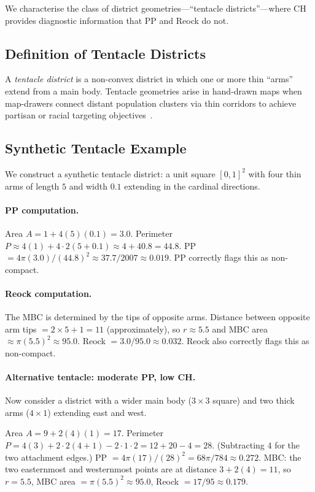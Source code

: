 We characterise the class of district geometries---``tentacle districts''---where
CH provides diagnostic information that PP and Reock do not.

\subsection{Definition of Tentacle Districts}

A \emph{tentacle district} is a non-convex district in which one or more
thin ``arms'' extend from a main body.
Tentacle geometries arise in hand-drawn maps when map-drawers connect distant
population clusters via thin corridors to achieve partisan or racial targeting
objectives~\citep{stephanopoulos2015partisan}.

\subsection{Synthetic Tentacle Example}

We construct a synthetic tentacle district: a unit square $[0,1]^2$ with
four thin arms of length $5$ and width $0.1$ extending in the cardinal directions.

\paragraph{PP computation.}
Area $A = 1 + 4(5)(0.1) = 3.0$.
Perimeter $P \approx 4(1) + 4 \cdot 2(5 + 0.1) \approx 4 + 40.8 = 44.8$.
PP $= 4\pi(3.0)/(44.8)^2 \approx 37.7/2007 \approx 0.019$.
PP correctly flags this as non-compact.

\paragraph{Reock computation.}
The MBC is determined by the tips of opposite arms.
Distance between opposite arm tips $= 2 \times 5 + 1 = 11$ (approximately),
so $r \approx 5.5$ and MBC area $\approx \pi(5.5)^2 \approx 95.0$.
Reock $= 3.0 / 95.0 \approx 0.032$.
Reock also correctly flags this as non-compact.

\paragraph{Alternative tentacle: moderate PP, low CH.}

Now consider a district with a wider main body ($3 \times 3$ square)
and two thick arms ($4 \times 1$) extending east and west.

Area $A = 9 + 2(4)(1) = 17$.
Perimeter $P = 4(3) + 2 \cdot 2(4 + 1) - 2 \cdot 1 \cdot 2 = 12 + 20 - 4 = 28$.
(Subtracting 4 for the two attachment edges.)
PP $= 4\pi(17)/(28)^2 = 68\pi/784 \approx 0.272$.
MBC: the two easternmost and westernmost points are at distance $3 + 2(4) = 11$,
so $r = 5.5$, MBC area $= \pi(5.5)^2 \approx 95.0$,
Reock $= 17/95 \approx 0.179$.

